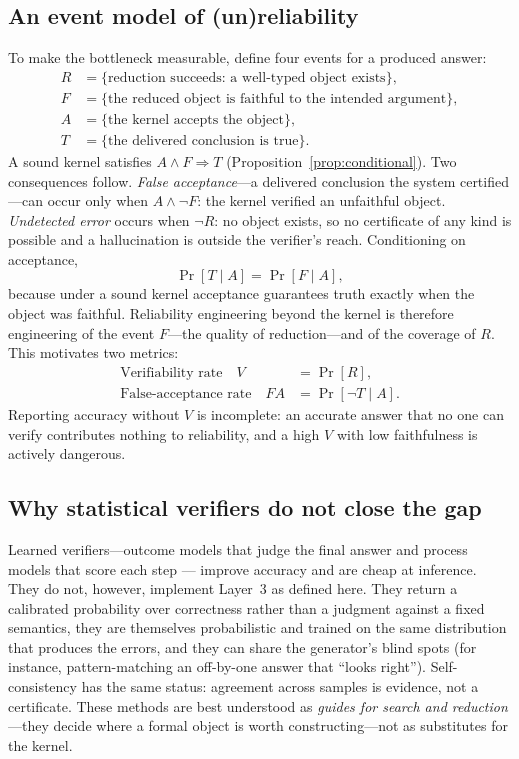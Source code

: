 \documentclass[11pt,a4paper]{article}
\theoremstyle{plain}
\theoremstyle{definition}
\theoremstyle{remark}
\begin{document}
\subsection{An event model of (un)reliability}
To make the bottleneck measurable, define four events for a produced
answer:
\begin{align}
R &= \{\text{reduction succeeds: a well-typed object exists}\},\\
F &= \{\text{the reduced object is faithful to the intended argument}\},\\
A &= \{\text{the kernel accepts the object}\},\\
T &= \{\text{the delivered conclusion is true}\}.
\end{align}
A sound kernel satisfies $A\wedge F \Rightarrow T$
(Proposition~\ref{prop:conditional}). Two consequences follow.
\emph{False acceptance}---a delivered conclusion the system certified---can
occur only when $A\wedge\neg F$: the kernel verified an unfaithful object.
\emph{Undetected error} occurs when $\neg R$: no object exists, so no
certificate of any kind is possible and a hallucination is outside the
verifier's reach. Conditioning on acceptance,
\begin{equation}
\Pr[T\mid A] = \Pr[F\mid A],
\end{equation}
because under a sound kernel acceptance guarantees truth exactly when the
object was faithful. Reliability engineering beyond the kernel is
therefore engineering of the event $F$---the quality of reduction---and of
the coverage of $R$. This motivates two metrics:
\begin{align}
\text{Verifiability rate}\quad V &= \Pr[R],\\
\text{False-acceptance rate}\quad \mathit{FA} &= \Pr[\neg T\mid A].
\end{align}
Reporting accuracy without $V$ is incomplete: an accurate answer that no
one can verify contributes nothing to reliability, and a high $V$ with low
faithfulness is actively dangerous.

\subsection{Why statistical verifiers do not close the gap}
Learned verifiers---outcome models that judge the final answer and process
models that score each step \citep{uesato2022process,lightman2024verify}---
improve accuracy and are cheap at inference. They do not, however,
implement Layer~3 as defined here. They return a calibrated probability
over correctness rather than a judgment against a fixed semantics, they are
themselves probabilistic and trained on the same distribution that
produces the errors, and they can share the generator's blind spots (for
instance, pattern-matching an off-by-one answer that ``looks right'').
Self-consistency \citep{wang2023selfconsistency} has the same status:
agreement across samples is evidence, not a certificate. These methods are
best understood as \emph{guides for search and reduction}---they decide
where a formal object is worth constructing---not as substitutes for the
kernel.
\end{document}
